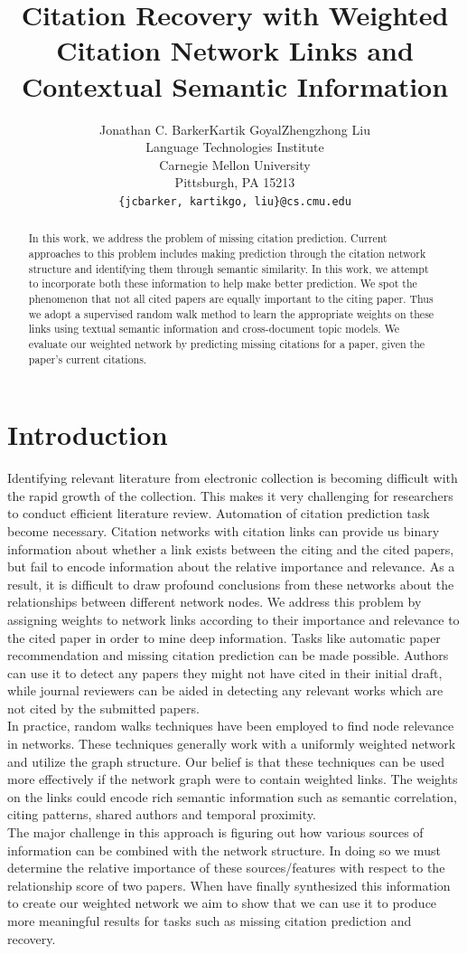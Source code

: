 \documentclass{article} %
\title{Citation Recovery with Weighted Citation Network Links and Contextual Semantic Information}
\author{
Jonathan C. Barker\tab Kartik Goyal\tab Zhengzhong Liu \\
Language Technologies Institute \\
Carnegie Mellon University \\
Pittsburgh, PA 15213 \\
\texttt{\{jcbarker, kartikgo, liu\}@cs.cmu.edu} \\
}
\begin{document}
\maketitle

\begin{abstract}
	In this work, we address the problem of missing citation prediction. Current approaches to this problem includes making prediction through the citation network structure and identifying them through semantic similarity. In this work, we attempt to incorporate both these information to help make better prediction. We spot the phenomenon that not all cited papers are equally important to the citing paper. Thus we adopt a supervised random walk method to learn the appropriate weights on these links using textual semantic information and cross-document topic models. We evaluate our weighted network by predicting missing citations for a paper, given the paper's current citations.
\end{abstract}

\section{Introduction}
Identifying relevant literature from electronic collection is becoming difficult with the rapid growth of the collection. This makes it very challenging for researchers to conduct efficient literature review. Automation of citation prediction task become necessary. Citation networks with citation links can provide us binary information about whether a link exists between the citing and the cited papers, but fail to encode information about the relative importance and relevance. As a result, it is difficult to draw profound conclusions from these networks about the relationships between different network nodes. We address this problem by assigning weights to network links according to their importance and relevance to the cited paper in order to mine deep information. Tasks like automatic paper recommendation and missing citation prediction can be made possible. Authors can use it to detect any papers they might not have cited in their initial draft, while journal reviewers can be aided in detecting any relevant works which are not cited by the submitted papers.\\
	In practice, random walks techniques \cite{Backstrom:2011:SRW:1935826.1935914,Sarkar2009,Tong2006} have been employed to find node relevance in networks. These techniques generally work with a uniformly weighted network and utilize the graph structure. Our belief is that these techniques can be used more effectively if the network graph were to contain weighted links. The weights on the links could encode rich semantic information such as semantic correlation, citing patterns, shared authors and temporal proximity.\\
The major challenge in this approach is figuring out how various sources of information can be combined with the network structure. In doing so we must determine the relative importance of these sources/features with respect to the relationship score of two papers. When have finally synthesized this information to create our weighted network we aim to show that we can use it to produce more meaningful results for tasks such as missing citation prediction and recovery.
\end{document}
